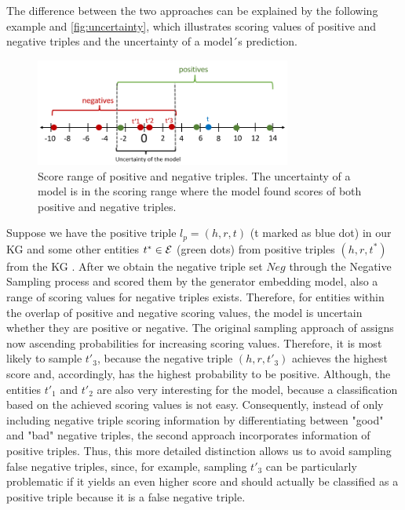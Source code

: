 The difference between the two approaches can be explained by the following example and \autoref{fig:uncertainty}, which illustrates scoring values of positive and negative triples and the uncertainty of a model´s prediction.
\begin{figure}[t]
  \centering
    \includegraphics[width=0.75\textwidth]{figures/uncertainty.PNG}
  \caption{Score range of positive and negative triples.
  The uncertainty of a model is in the scoring range where the model found scores of both positive and negative triples.}
  \label{fig:uncertainty}
\end{figure}
Suppose we have the positive triple $l_p=(h,r,t)$ (t marked as blue dot) in our KG and some other entities $t^* \in \mathcal{E}$ (green dots) from positive triples $(h,r,t^*)$ from the \ac{KG} .
After we obtain the negative triple set $Neg$ through the Negative Sampling process and scored them by the generator embedding model, also a range of scoring values for negative triples exists. 
Therefore, for entities within the overlap of positive and negative scoring values, the model is uncertain whether they are positive or negative.
The original sampling approach of \kbgan assigns now ascending probabilities for increasing scoring values.
Therefore, it is most likely to sample $t'_3$, because the negative triple $(h,r,t'_3)$ achieves the highest score and, accordingly, has the highest probability to be positive.
Although, the entities $t'_1$ and $t'_2$ are also very interesting for the model, because a classification based on the achieved scoring values is not easy.
Consequently, instead of only including negative triple scoring information by differentiating between "good" and "bad" negative triples, the second approach incorporates information of positive triples.
Thus, this more detailed distinction allows us to avoid sampling false negative triples, since, for example, sampling $t'_3$ can be particularly problematic if it yields an even higher score and should actually be classified as a positive triple because it is a false negative triple.


